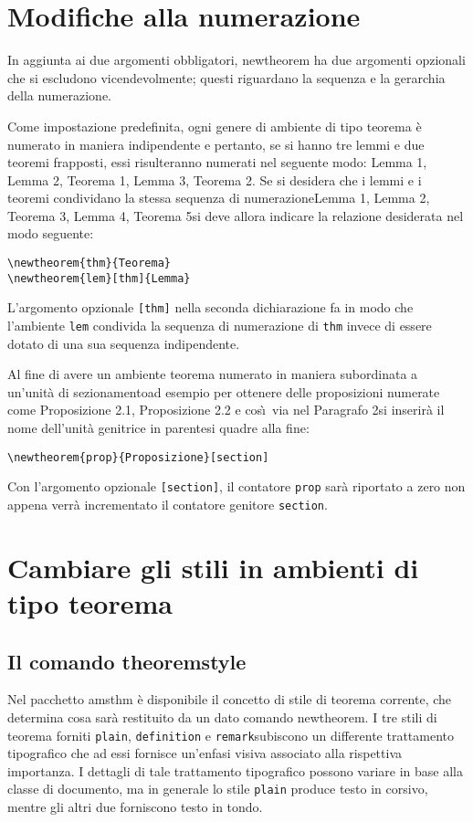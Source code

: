 \documentclass[a4paper]{article}
\providecommand{\mdash}{\textemdash\penalty\hyphenpenalty}
\newcommand{\ntt}{%
  \fontfamily\ttdefault \fontseries\mddefault \fontshape\updefault
  \selectfont
}
\DeclareRobustCommand{\cn}[1]{{\ntt\bslchar#1}}
\DeclareRobustCommand{\pkg}[1]{{\ntt#1}}
\begin{document}
\section{Modifiche alla numerazione}

In aggiunta ai due argomenti obbligatori, \cn{newtheorem} ha due
argomenti opzionali che si escludono vicendevolmente; questi riguardano
la sequenza e la gerarchia della numerazione.

Come impostazione predefinita, ogni genere di ambiente di tipo teorema
\`e numerato in maniera indipendente e pertanto, se si hanno tre lemmi e
due teoremi frapposti, essi risulteranno numerati nel seguente modo: Lemma 1, Lemma
2, Teorema 1, Lemma 3, Teorema 2. Se si desidera che i lemmi e i teoremi
condividano la stessa sequenza di numerazione\mdash Lemma 1, Lemma 2, Teorema 3, Lemma
4, Teorema 5\mdash si deve allora indicare la relazione desiderata nel
modo seguente:
\begin{verbatim}
\newtheorem{thm}{Teorema}
\newtheorem{lem}[thm]{Lemma}
\end{verbatim}
L'argomento opzionale \verb'[thm]' nella seconda dichiarazione fa in
modo che l'ambiente \texttt{lem} condivida la sequenza di numerazione di
\texttt{thm} invece di essere dotato di una sua sequenza indipendente.

Al fine di avere un ambiente teorema numerato in maniera subordinata a
un'unit\`a di sezionamento\mdash ad esempio per ottenere delle
proposizioni numerate come Proposizione 2.1,
Proposizione 2.2 e cos\`\i\ via nel Paragrafo 2\mdash si inserir\`a il nome
dell'unit\`a genitrice in parentesi quadre alla fine:
\begin{verbatim}
\newtheorem{prop}{Proposizione}[section]
\end{verbatim}
Con l'argomento opzionale \verb'[section]', il contatore \verb'prop'
sar\`a riportato a zero non appena verr\`a incrementato il contatore genitore \verb'section'.

\section{Cambiare gli stili in ambienti di tipo teorema}

\subsection{Il comando \cn{theoremstyle}}

Nel pacchetto \pkg{amsthm} \`e disponibile il concetto di stile di
teorema corrente,
che determina cosa sar\`a restituito da un dato comando \cn{newtheorem}.
I tre stili di teorema forniti\mdash
\verb'plain',\relax
{}\relax
{} \verb'definition' e
\verb'remark'\mdash subiscono un differente trattamento tipografico che
ad essi fornisce un'enfasi visiva associato alla rispettiva
importanza. I dettagli di tale trattamento tipografico possono variare
in base alla classe di documento, ma in generale lo stile \verb'plain'
produce testo in corsivo, mentre gli altri due forniscono testo in tondo.
\end{document}
